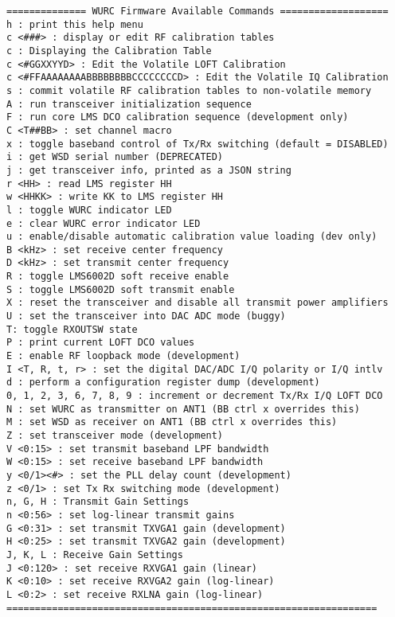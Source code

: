 \begin{singlespace}
\small
\begin{verbatim}
============== WURC Firmware Available Commands ===================
h : print this help menu
c <###> : display or edit RF calibration tables
c : Displaying the Calibration Table
c <#GGXXYYD> : Edit the Volatile LOFT Calibration
c <#FFAAAAAAAABBBBBBBBCCCCCCCCD> : Edit the Volatile IQ Calibration
s : commit volatile RF calibration tables to non-volatile memory
A : run transceiver initialization sequence
F : run core LMS DCO calibration sequence (development only)
C <T##BB> : set channel macro
x : toggle baseband control of Tx/Rx switching (default = DISABLED)
i : get WSD serial number (DEPRECATED)
j : get transceiver info, printed as a JSON string
r <HH> : read LMS register HH
w <HHKK> : write KK to LMS register HH
l : toggle WURC indicator LED
e : clear WURC error indicator LED
u : enable/disable automatic calibration value loading (dev only)
B <kHz> : set receive center frequency
D <kHz> : set transmit center frequency
R : toggle LMS6002D soft receive enable
S : toggle LMS6002D soft transmit enable
X : reset the transceiver and disable all transmit power amplifiers
U : set the transceiver into DAC ADC mode (buggy)
T: toggle RXOUTSW state
P : print current LOFT DCO values
E : enable RF loopback mode (development)
I <T, R, t, r> : set the digital DAC/ADC I/Q polarity or I/Q intlv
d : perform a configuration register dump (development)
0, 1, 2, 3, 6, 7, 8, 9 : increment or decrement Tx/Rx I/Q LOFT DCO
N : set WURC as transmitter on ANT1 (BB ctrl x overrides this)
M : set WSD as receiver on ANT1 (BB ctrl x overrides this)
Z : set transceiver mode (development)
V <0:15> : set transmit baseband LPF bandwidth
W <0:15> : set receive baseband LPF bandwidth
y <0/1><#> : set the PLL delay count (development)
z <0/1> : set Tx Rx switching mode (development)
n, G, H : Transmit Gain Settings
n <0:56> : set log-linear transmit gains
G <0:31> : set transmit TXVGA1 gain (development)
H <0:25> : set transmit TXVGA2 gain (development)
J, K, L : Receive Gain Settings
J <0:120> : set receive RXVGA1 gain (linear)
K <0:10> : set receive RXVGA2 gain (log-linear)
L <0:2> : set receive RXLNA gain (log-linear)
=================================================================
\end{verbatim}
\end{singlespace}


%
%
%
